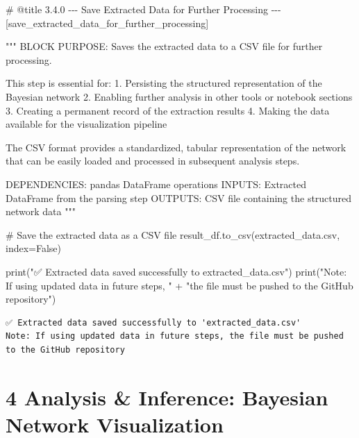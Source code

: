 \documentclass[
  11pt,
  letterpaper,
]{book}
\newenvironment{Shaded}{\begin{snugshade}}{\end{snugshade}}
\newcommand{\BuiltInTok}[1]{\textcolor[rgb]{0.00,0.23,0.31}{#1}}
\newcommand{\CommentTok}[1]{\textcolor[rgb]{0.37,0.37,0.37}{#1}}
\newcommand{\NormalTok}[1]{\textcolor[rgb]{0.00,0.23,0.31}{#1}}
\newcommand{\OperatorTok}[1]{\textcolor[rgb]{0.37,0.37,0.37}{#1}}
\newcommand{\StringTok}[1]{\textcolor[rgb]{0.13,0.47,0.30}{#1}}
\newcommand{\VariableTok}[1]{\textcolor[rgb]{0.07,0.07,0.07}{#1}}
\begin{document}
\label{save_extracted_data_for_further_processing}
\begin{Shaded}
\begin{Highlighting}[]
\CommentTok{\# @title 3.4.0 {-}{-}{-} Save Extracted Data for Further Processing {-}{-}{-} [save\_extracted\_data\_for\_further\_processing]}

\CommentTok{"""}
\CommentTok{BLOCK PURPOSE: Saves the extracted data to a CSV file for further processing.}

\CommentTok{This step is essential for:}
\CommentTok{1. Persisting the structured representation of the Bayesian network}
\CommentTok{2. Enabling further analysis in other tools or notebook sections}
\CommentTok{3. Creating a permanent record of the extraction results}
\CommentTok{4. Making the data available for the visualization pipeline}

\CommentTok{The CSV format provides a standardized, tabular representation of the network}
\CommentTok{that can be easily loaded and processed in subsequent analysis steps.}

\CommentTok{DEPENDENCIES: pandas DataFrame operations}
\CommentTok{INPUTS: Extracted DataFrame from the parsing step}
\CommentTok{OUTPUTS: CSV file containing the structured network data}
\CommentTok{"""}

\CommentTok{\# Save the extracted data as a CSV file}
\NormalTok{result\_df.to\_csv(}\StringTok{\textquotesingle{}extracted\_data.csv\textquotesingle{}}\NormalTok{, index}\OperatorTok{=}\VariableTok{False}\NormalTok{)}

\BuiltInTok{print}\NormalTok{(}\StringTok{"✅ Extracted data saved successfully to \textquotesingle{}extracted\_data.csv\textquotesingle{}"}\NormalTok{)}
\BuiltInTok{print}\NormalTok{(}\StringTok{"Note: If using updated data in future steps, "}
        \OperatorTok{+} \StringTok{"the file must be pushed to the GitHub repository"}\NormalTok{)}
\end{Highlighting}
\end{Shaded}

\begin{verbatim}
✅ Extracted data saved successfully to 'extracted_data.csv'
Note: If using updated data in future steps, the file must be pushed to the GitHub repository
\end{verbatim}

\chapter{4 Analysis \& Inference: Bayesian Network
Visualization}\label{analysis-inference-bayesian-network-visualization}
\end{document}
